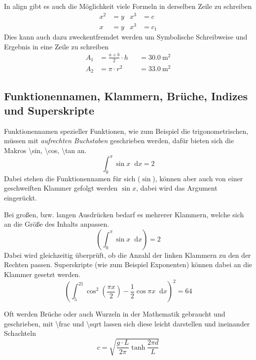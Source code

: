 \documentclass[logo/language=en]{tudcdartcl}
\newcommand{\diff}{\mathop{}\!\mathrm{d}}
\begin{document}
In align gibt es auch die Möglichkeit viele Formeln in derselben Zeile zu schreiben \begin{align*}
    x^2 &= y & x^3 &= c\\
    x   &= y & x^3 &= c_1
\end{align*}
Dies kann auch dazu zweckentfremdet werden um Symbolische Schreibweise und Ergebnis in eine Zeile zu schreiben \begin{align}
    A_1 &= \frac{a + b}{2} \cdot h &&= \SI{30.0}{\m\squared} \\
    A_2 &= \pi \cdot r^2 &&= \SI{33.0}{\m\squared}
\end{align}


\subsection{Funktionennamen, Klammern, Brüche, Indizes und Superskripte}

Funktionennamen spezieller Funktionen, wie zum Beispiel die trigonometrischen, müssen mit \textit{aufrechten Buchstaben} geschrieben werden, dafür bieten sich die Makros \textbackslash sin, \textbackslash cos, \textbackslash tan an.
\begin{equation}
    \int_0^\pi \sin{x} \diff x = 2
\end{equation}
Dabei stehen die Funktionennamen für sich ($\sin$), können aber auch von einer geschweiften Klammer gefolgt werden $\sin{x}$, dabei wird das Argument eingerückt.

Bei großen, bzw. langen Ausdrücken bedarf es mehrerer Klammern, welche sich an die Größe des Inhalts anpassen.
\begin{equation}
    \left( \int_0^\pi \sin{x} \diff x \right)= 2
\end{equation}
Dabei wird gleichzeitig überprüft, ob die Anzahl der linken Klammern zu den der Rechten passen.
Superskripte (wie zum Beispiel Exponenten) können dabei an die Klammer gesetzt werden.
\begin{equation}
    \left(\int_5^{21} \cos^2\left(\frac{\pi x}{2}\right) - \frac{1}{2} \cos{\pi x} \diff x \right)^2 = 64
\end{equation}

Oft werden Brüche oder auch Wurzeln in der Mathematik gebraucht und geschrieben, mit \textbackslash frac und \textbackslash sqrt lassen sich diese leicht darstellen und ineinander Schachteln \begin{equation}
    c = \sqrt{\frac{g \cdot L}{2\pi} \tanh{\frac{2\pi d}{L}}}
\end{equation}
\end{document}
